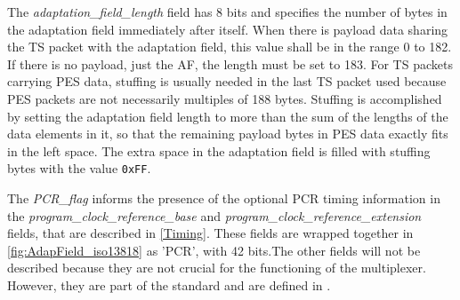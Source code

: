 \documentclass[
	12pt,				%
	openright,			%
	twoside,			%
	a4paper,			%
	brazil,
	french,				%
	english
	]{abntex2}
\begin{document}
The \textit{adaptation\hspace{0.1mm}\_\hspace{0.1mm}field\hspace{0.1mm}\_\hspace{0.1mm}length} field has 8 bits and specifies the number of bytes in the adaptation field immediately after itself. When there is payload data sharing the TS packet with the adaptation field, this value shall be in the range 0 to 182. If there is no payload, just the AF, the length must be set to 183. For TS packets carrying PES data, stuffing is usually needed in the last TS packet used because PES packets are not necessarily multiples of 188 bytes. Stuffing is accomplished by setting the adaptation field length to more than the sum of the lengths of the data elements in it, so that the remaining payload bytes in PES data exactly fits in the left space. The extra space in the adaptation field is filled with stuffing bytes with the value \texttt{0xFF}.


The \textit{PCR\hspace{0.1mm}\_\hspace{0.1mm}flag} informs the presence of the optional PCR timing information in the \textit{program\hspace{0.1mm}\_\hspace{0.1mm}clock\hspace{0.1mm}\_\hspace{0.1mm}reference\hspace{0.1mm}\_\hspace{0.1mm}base} and \textit{program\hspace{0.1mm}\_\hspace{0.1mm}clock\hspace{0.1mm}\_\hspace{0.1mm}reference\hspace{0.1mm}\_\hspace{0.1mm}extension} fields, that are described in \autoref{Timing}. These fields are wrapped together in \autoref{fig:AdapField_iso13818} as 'PCR', with 42 bits.The other fields will not be described because they are not crucial for the functioning of the multiplexer. However, they are part of the standard and are defined in .
\end{document}
